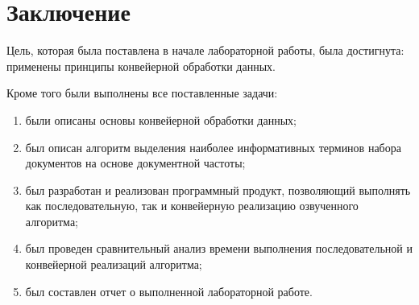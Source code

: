 \chapter*{Заключение}

Цель, которая была поставлена в начале лабораторной работы, была достигнута: применены принципы конвейерной обработки данных.

Кроме того были выполнены все поставленные задачи:
\begin{enumerate}
	\item были описаны основы конвейерной обработки данных;
	\item был описан алгоритм выделения наиболее информативных терминов набора документов на основе документной частоты;
	\item был разработан и реализован программный продукт, позволяющий выполнять как последовательную, так и конвейерную реализацию озвученного алгоритма;
	\item был проведен сравнительный анализ времени выполнения последовательной и конвейерной реализаций алгоритма;
	\item был составлен отчет о выполненной лабораторной работе.
\end{enumerate}